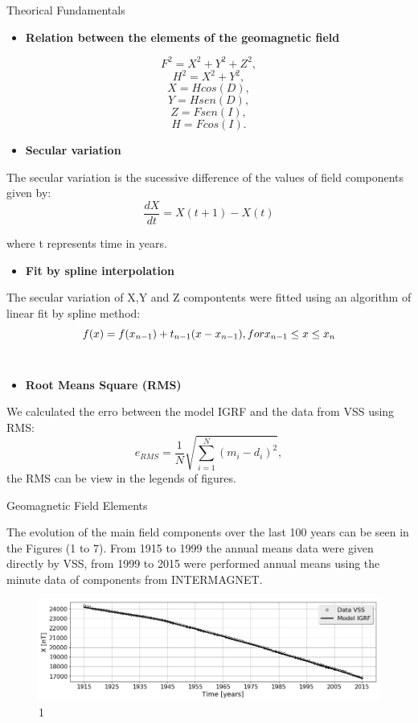 \documentclass[final,t]{beamer}
\begin{document}
\begin{columns}[t]
\begin{column}{.66\linewidth}
\begin{columns}
\begin{column}{.31\linewidth}
\begin{block}{Theorical Fundamentals}


\begin{itemize}
\item \bf{Relation between the elements of the geomagnetic field}
\end{itemize}	
\[ F^{2} = X^{2} + Y^{2} + Z^{2},\]
 \[  H^{2} = X^{2} + Y^{2}, \]
\[	   X = Hcos(D),\]
\[	   Y = Hsen(D),\]
\[	   Z = Fsen(I),\]
\[	   H = Fcos(I).\]
   	

\begin{itemize}	
	\item \bf{Secular variation}
\end{itemize}
The secular variation is the sucessive difference of the values of field components given by:
\[\frac{dX}{dt} = X(t+1)-X(t)\]

where t represents time in years.

\begin{itemize}
		\item \bf{Fit by spline interpolation}
\end{itemize}
The secular variation of X,Y and Z compontents were fitted using an algorithm  of linear fit by spline method: 
	\[ f(x)= f(x_{n-1})+t_{n-1}(x-x_{n-1}), \\
	for x_{n-1} \le x \le x_{n} \]\\

\begin{itemize}
\item \bf{Root Means Square (RMS)}
\end{itemize}
We calculated the erro between the model IGRF and the data from VSS using RMS:
\[e_{RMS}=\frac{1}{N} \sqrt{\sum\limits_{i=1}^{N}(m_{i}-d_{i})^{2}}, 
\]
the RMS can be view in the legends of figures.
 
	
\end{block}	

\begin{block}{Geomagnetic Field Elements}
\justifying

The evolution of the main field components over the last 100 years can be seen in the Figures (1 to 7). From 1915 to 1999 the  annual means data  were given directly by VSS, from 1999 to 2015 were performed annual means using the minute data of components from INTERMAGNET.

\begin{figure}
\centering
\includegraphics[scale=0.5]{"figs_ed/X mean all_V3"}
\caption[1]{1}
\label{fig:Xmeanall_V2}
\end{figure}
   

\end{block}
\end{column}
\end{columns}
\end{column}
\end{columns}
\end{document}
